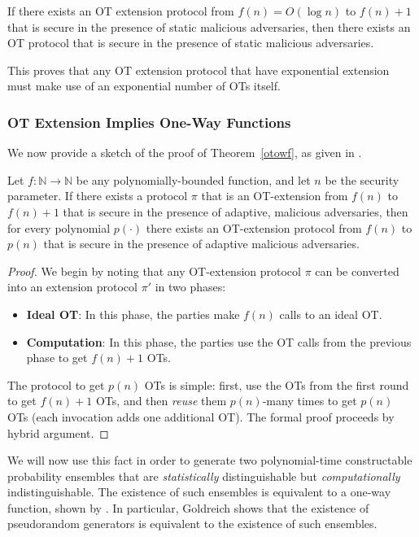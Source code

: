 \begin{theorem}
	If \rarrow there exists an OT extension protocol from $f(n)=O(\log n)$ to $f(n)+1$ that is secure in the presence of static malicious adversaries, then there exists an OT protocol that is secure in the presence of static malicious adversaries.
\end{theorem}

This proves that any OT extension protocol that have exponential extension must make use of an exponential number of OTs itself.

\subsubsection{OT Extension Implies One-Way Functions}

We now provide a sketch of the proof of Theorem~\ref{otowf}, as given in \cite{lindell2013feasibility}.

\begin{lemma}
	Let \rarrow $f:\mathbb{N}\rightarrow\mathbb{N}$ be any polynomially-bounded function, and let $n$ be the security parameter. If there exists a protocol $\pi$ that is an OT-extension from $f(n)$ to $f(n)+1$ that is secure in the presence of adaptive, malicious adversaries, then for every polynomial $p(\cdot)$ there exists an OT-extension protocol from $f(n)$ to $p(n)$ that is secure in the presence of adaptive malicious adversaries.
\end{lemma}

\begin{proof}
	We begin by noting that any OT-extension protocol $\pi$ can be converted into an extension protocol $\pi'$ in two phases:
	\begin{itemize}
		\item\textbf{Ideal OT}: In this phase, the parties make $f(n)$ calls to an ideal OT.
		\item\textbf{Computation}: In this phase, the parties use the OT calls from the previous phase to get $f(n)+1$ OTs.
	\end{itemize}
	The protocol to get $p(n)$ OTs is simple: first, use the OTs from the first round to get $f(n)+1$ OTs, and then \textit{reuse} them $p(n)$-many times to get $p(n)$ OTs (each invocation adds one additional OT). The formal proof proceeds by hybrid argument.
\end{proof}

We will now use this fact in order to generate two polynomial-time constructable probability ensembles that are \textit{statistically} distinguishable but \textit{computationally} indistinguishable. The existence of such ensembles is equivalent to a one-way function, shown by \cite{goldreich1990note}. In particular, Goldreich shows that the existence of pseudorandom generators is equivalent to the existence of such ensembles.

